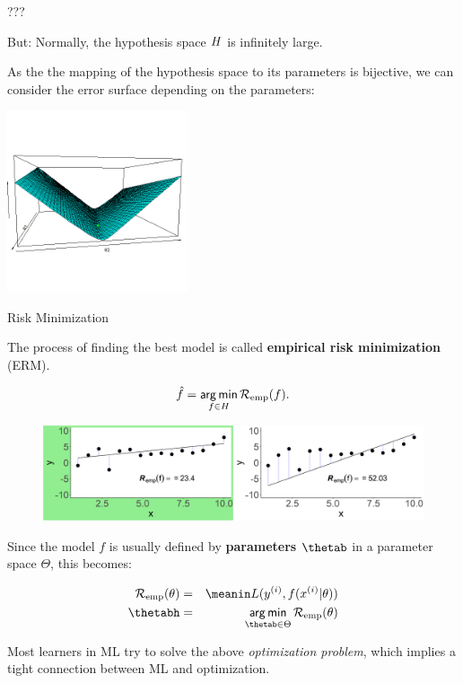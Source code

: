 \documentclass[11pt,compress,t,notes=noshow, xcolor=table]{beamer}
\begin{document}
\begin{vbframe}{???}

But: Normally, the hypothesis space $H$ is infinitely large. 

\lz

As the the mapping of the hypothesis space to its parameters is bijective, we can consider the error surface depending on the parameters:

\begin{center}
\includegraphics[width=0.4\textwidth]{figure/ml-basic-riskmin-error-surface.png}
\end{center}

\end{vbframe}

\begin{vbframe}{Risk Minimization}


The process of finding the best model is called \textbf{empirical risk minimization} (ERM).

$$
\hat{f} = \mathop{\sf arg\,min}_{f \in H} \mathcal{R}_{\text{emp}}(f).
$$

\lz

\begin{center}
\begin{figure}[b]
\includegraphics[width=1\textwidth]{figure/ml-basic_riskmin-3-risk-min.png}
\end{figure}
\end{center}


\framebreak

Since the model $f$ is usually defined by \textbf{parameters} $\thetab$ in a parameter space $\Theta$, this becomes:

\begin{eqnarray*}
\risket & = & \meanin \Lxyit \cr
\thetabh & = & \argmin_{\thetab \in \Theta} \risket
\end{eqnarray*}

Most learners in ML try to solve the above \emph{optimization problem}, which implies a tight connection between ML and optimization.

\end{vbframe}
\end{document}

